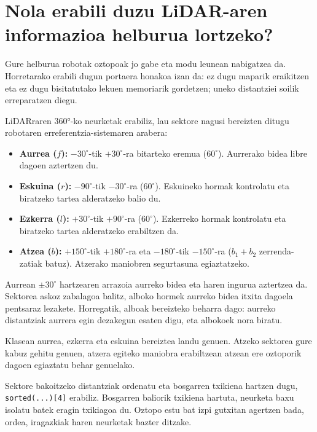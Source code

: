 \section[Nola erabili duzu LiDAR-aren informazioa helburua lortzeko?][LiDAR informazioaren erabilera]{Nola erabili duzu LiDAR-aren informazioa helburua lortzeko?}\label{sec:oz-sektoreak}

Gure helburua robotak oztopoak jo gabe eta modu leunean nabigatzea da. Horretarako erabili dugun portaera honakoa izan da: ez dugu maparik eraikitzen eta ez dugu bisitatutako lekuen memoriarik gordetzen; uneko distantziei soilik erreparatzen diegu.

LiDARraren 360°-ko neurketak erabiliz, lau sektore nagusi bereizten ditugu robotaren erreferentzia-sistemaren arabera:
\begin{itemize}[noitemsep,topsep=2pt]
  \item \textbf{Aurrea ($f$):} $-30^\circ$-tik $+30^\circ$-ra bitarteko eremua ($60^\circ$). Aurrerako bidea libre dagoen aztertzen du.
  \item \textbf{Eskuina ($r$):} $-90^\circ$-tik $-30^\circ$-ra ($60^\circ$). Eskuineko hormak kontrolatu eta biratzeko tartea alderatzeko balio du.
  \item \textbf{Ezkerra ($l$):} $+30^\circ$-tik $+90^\circ$-ra ($60^\circ$). Ezkerreko hormak kontrolatu eta biratzeko tartea alderatzeko erabiltzen da.
  \item \textbf{Atzea ($b$):} $+150^\circ$-tik $+180^\circ$-ra eta $-180^\circ$-tik $-150^\circ$-ra ($b_1 + b_2$ zerrenda-zatiak batuz). Atzerako maniobren segurtasuna egiaztatzeko.
\end{itemize}

Aurrean $\pm 30^\circ$ hartzearen arrazoia aurreko bidea eta haren ingurua aztertzea da. Sektorea askoz zabalagoa balitz, alboko hormek aurreko bidea itxita dagoela pentsaraz lezakete. Horregatik, alboak bereizteko beharra dago: aurreko distantziak aurrera egin dezakegun esaten digu, eta albokoek nora biratu.

Klasean aurrea, ezkerra eta eskuina bereiztea landu genuen. Atzeko sektorea gure kabuz gehitu genuen, atzera egiteko maniobra erabiltzean atzean ere oztoporik dagoen egiaztatu behar genuelako.

Sektore bakoitzeko distantziak ordenatu eta bosgarren txikiena hartzen dugu, \texttt{sorted(...)[4]} erabiliz. Bosgarren baliorik txikiena hartuta, neurketa baxu isolatu batek eragin txikiagoa du. Oztopo estu bat izpi gutxitan agertzen bada, ordea, iragazkiak haren neurketak bazter ditzake.

